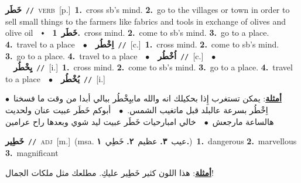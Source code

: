 \documentclass[10pt,a4paper,twoside]{article} %
\begin{document}
\begin{multicols}{2}
{\setlength\topsep{0pt}\textbf{\foreignlanguage{arabic}{خَطَر}}\ {\color{gray}\texttt{//}\color{black}}\ \textsc{verb}\ [p.]\ \textbf{1.}~cross sb's mind.  \textbf{2.}~go to the villages or town in order to sell small things to the farmers like fabrics and tools in exchange of olives and olive oil\ \ $\smblkdiamond$\ \ \setlength\topsep{0pt}\textbf{\foreignlanguage{arabic}{خَطَر}}\ \textbf{1.}~cross mind.  \textbf{2.}~come to sb's mind.  \textbf{3.}~go to a place.  \textbf{4.}~travel to a place\ \ $\bullet$\ \ \setlength\topsep{0pt}\textbf{\foreignlanguage{arabic}{اِخْطُر}}\ {\color{gray}\texttt{//}\color{black}}\ [c.]\ \textbf{1.}~cross mind.  \textbf{2.}~come to sb's mind.  \textbf{3.}~go to a place.  \textbf{4.}~travel to a place\ \ $\bullet$\ \ \setlength\topsep{0pt}\textbf{\foreignlanguage{arabic}{اُخْطُر}}\ {\color{gray}\texttt{//}\color{black}}\ [c.]\ \ $\bullet$\ \ \setlength\topsep{0pt}\textbf{\foreignlanguage{arabic}{يِخْطُر}}\ {\color{gray}\texttt{//}\color{black}}\ [i.]\ \textbf{1.}~cross mind.  \textbf{2.}~come to sb's mind.  \textbf{3.}~go to a place.  \textbf{4.}~travel to a place\ \ $\bullet$\ \ \setlength\topsep{0pt}\textbf{\foreignlanguage{arabic}{يُخْطُر}}\ {\color{gray}\texttt{//}\color{black}}\ [i.]\  \begin{flushright}\color{gray}\foreignlanguage{arabic}{\textbf{\underline{\foreignlanguage{arabic}{أمثلة}}}: يمكن تستغرب إِذا بحكيلك انه والله مابيِخْطُر ببالي أبدا من وقت ما فسخنا\ $\bullet$\ \  اِخْطُر بسرعة عالبلد قبل ماتغيب الشمس.\ $\bullet$\ \  أبوكم خَطَر عبيت عنان ولحديت هالساعة مارجعش\ $\bullet$\ \  خالي امبارحيات خَطَر عبيت ليد شوي وبعدها راح عرامين}\end{flushright}\color{black}} \vspace{2mm}

{\setlength\topsep{0pt}\textbf{\foreignlanguage{arabic}{خَطِير}}\ {\color{gray}\texttt{//}\color{black}}\ \textsc{adj}\ [m.]\ \color{gray}(msa. \foreignlanguage{arabic}{عيب}~\foreignlanguage{arabic}{\textbf{٣.}}  \foreignlanguage{arabic}{عظيم}~\foreignlanguage{arabic}{\textbf{٢.}}  \foreignlanguage{arabic}{خَطِي}~\foreignlanguage{arabic}{\textbf{١.}})\color{black}\ \textbf{1.}~dangerous  \textbf{2.}~marvellous  \textbf{3.}~magnificant\  \begin{flushright}\color{gray}\foreignlanguage{arabic}{\textbf{\underline{\foreignlanguage{arabic}{أمثلة}}}: هذا اللون كثير خَطِير عليكِ. مطلعك مثل ملكات الجمال!}\end{flushright}\color{black}} \vspace{2mm}


\end{multicols}
\end{document}
